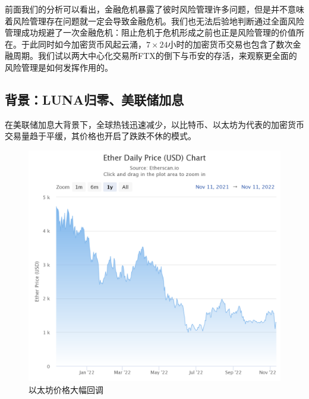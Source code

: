 前面我们的分析可以看出，金融危机暴露了彼时风险管理许多问题，但是并不意味着风险管理存在问题就一定会导致金融危机。我们也无法后验地判断通过全面风险管理成功规避了一次金融危机：阻止危机于危机形成之前也正是风险管理的价值所在。于此同时如今加密货币风起云涌，$7\times 24$小时的加密货币交易也包含了数次金融周期。我们试以两大中心化交易所FTX的倒下与币安的存活，来观察更全面的风险管理是如何发挥作用的。

\subsection{背景：LUNA归零、美联储加息}

在美联储加息大背景下，全球热钱迅速减少，以比特币、以太坊为代表的加密货币交易量趋于平缓，其价格也开启了跌跌不休的模式。

\begin{figure}[H]
    \begin{minipage}[t]{0.48\linewidth}
        \includegraphics[width=\linewidth]{img/ether-daily-price-usd-ch.png}
        \caption{以太坊价格大幅回调}
    \end{minipage}
    \begin{minipage}[t]{0.48\linewidth}

\end{minipage}
\end{figure}
